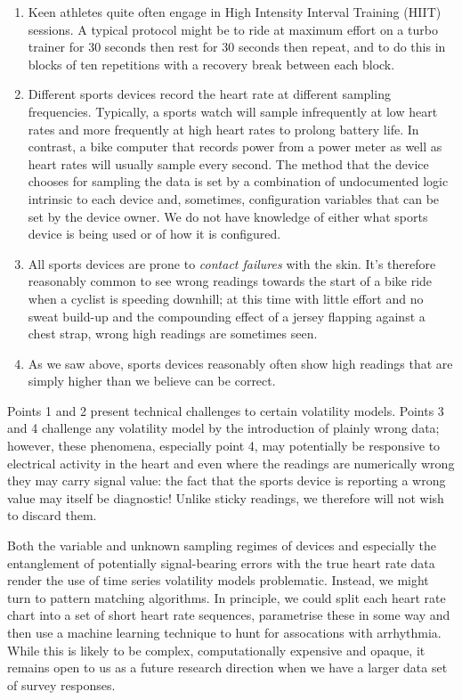 \documentclass[
  letterpaper,
  DIV=11,
  numbers=noendperiod]{scrartcl}
\providecommand{\tightlist}{%
  \setlength{\itemsep}{0pt}\setlength{\parskip}{0pt}}\usepackage{longtable,booktabs,array}
\begin{document}
\begin{enumerate}
\def\labelenumi{\arabic{enumi}.}
\tightlist
\item
  Keen athletes quite often engage in High Intensity Interval Training
  (HIIT) sessions. A typical protocol might be to ride at maximum effort
  on a turbo trainer for 30 seconds then rest for 30 seconds then
  repeat, and to do this in blocks of ten repetitions with a recovery
  break between each block.
\item
  Different sports devices record the heart rate at different sampling
  frequencies. Typically, a sports watch will sample infrequently at low
  heart rates and more frequently at high heart rates to prolong battery
  life. In contrast, a bike computer that records power from a power
  meter as well as heart rates will usually sample every second. The
  method that the device chooses for sampling the data is set by a
  combination of undocumented logic intrinsic to each device and,
  sometimes, configuration variables that can be set by the device
  owner. We do not have knowledge of either what sports device is being
  used or of how it is configured.
\item
  All sports devices are prone to \emph{contact failures} with the skin.
  It's therefore reasonably common to see wrong readings towards the
  start of a bike ride when a cyclist is speeding downhill; at this time
  with little effort and no sweat build-up and the compounding effect of
  a jersey flapping against a chest strap, wrong high readings are
  sometimes seen.
\item
  As we saw above, sports devices reasonably often show high readings
  that are simply higher than we believe can be correct.
\end{enumerate}

Points 1 and 2 present technical challenges to certain volatility
models. Points 3 and 4 challenge any volatility model by the
introduction of plainly wrong data; however, these phenomena, especially
point 4, may potentially be responsive to electrical activity in the
heart and even where the readings are numerically wrong they may carry
signal value: the fact that the sports device is reporting a wrong value
may itself be diagnostic! Unlike sticky readings, we therefore will not
wish to discard them.

Both the variable and unknown sampling regimes of devices and especially
the entanglement of potentially signal-bearing errors with the true
heart rate data render the use of time series volatility models
problematic. Instead, we might turn to pattern matching algorithms. In
principle, we could split each heart rate chart into a set of short
heart rate sequences, parametrise these in some way and then use a
machine learning technique to hunt for assocations with arrhythmia.
While this is likely to be complex, computationally expensive and
opaque, it remains open to us as a future research direction when we
have a larger data set of survey responses.
\end{document}

